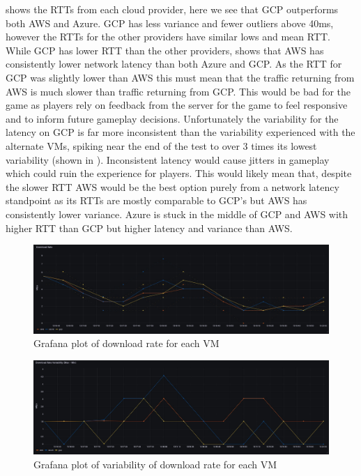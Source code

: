 \documentclass[11pt,a4paper]{article}
\begin{document}
 shows the RTTs from each cloud provider, here we see that GCP outperforms both AWS and Azure. GCP has less variance and fewer outliers above 40ms, however the RTTs for the other providers have similar lows and mean RTT. While GCP has lower RTT than the other providers,  shows that AWS has consistently lower network latency than both Azure and GCP. As the RTT for GCP was slightly lower than AWS this must mean that the traffic returning from AWS is much slower than traffic returning from GCP. This would be bad for the game as players rely on feedback from the server for the game to feel responsive and to inform future gameplay decisions. Unfortunately the variability for the latency on GCP is far more inconsistent than the variability experienced with the alternate VMs, spiking near the end of the test to over 3 times its lowest variability (shown in ). Inconsistent latency would cause jitters in gameplay which could ruin the experience for players. This would likely mean that, despite the slower RTT AWS would be the best option purely from a network latency standpoint as its RTTs are mostly comparable to GCP's but AWS has consistently lower variance. Azure is stuck in the middle of GCP and AWS with higher RTT than GCP but higher latency and variance than AWS. %

\begin{figure}
\includegraphics[width=\textwidth]{DownloadRate.jpeg}
\caption{Grafana plot of download rate for each VM}
\label{download}
\end{figure}

\begin{figure}
\includegraphics[width=\textwidth]{DownloadRateVar.jpeg}
\caption{Grafana plot of variability of download rate for each VM}
\label{downloadvar}
\end{figure}
\end{document}
